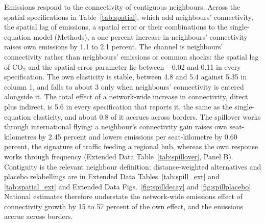 \documentclass[12pt]{extarticle}
\begin{document}
Emissions respond to the connectivity of contiguous neighbours. Across the
spatial specifications in Table~\ref{tab:spatial}, which add neighbours'
connectivity, the spatial lag of emissions, a spatial error or their
combinations to the single-equation model (Methods), a one percent
increase in neighbours' connectivity raises own emissions by 1.1 to 2.1
percent. The channel is neighbours' connectivity rather than neighbours'
emissions or common shocks: the spatial lag of CO$_2$ and the
spatial-error parameter lie between $-$0.02 and 0.11 in every
specification. The own elasticity is stable, between 4.8 and 5.4 against
5.35 in column 1, and falls to about 3 only when neighbours' connectivity
is entered alongside it. The total effect of a network-wide increase in
connectivity, direct plus indirect, is 5.6 in every specification that
reports it, the same as the single-equation elasticity, and about 0.8 of
it accrues across borders. The spillover works through international
flying: a neighbour's connectivity gain raises own seat-kilometres by 2.45
percent and lowers emissions per seat-kilometre by 0.60 percent, the
signature of traffic feeding a regional hub, whereas the own response
works through frequency (Extended Data Table~\ref{tab:spillover}, Panel
B). Contiguity is the relevant neighbour definition; distance-weighted
alternatives and placebo relabellings are in Extended Data
Tables~\ref{tab:spill_ext} and \ref{tab:spatial_ext} and Extended Data
Figs.~\ref{fig:spilldecay} and \ref{fig:spillplacebo}. National estimates
therefore understate the network-wide emissions effect of connectivity
growth by 15 to 57 percent of the own effect, and the emissions accrue
across borders.
\end{document}
